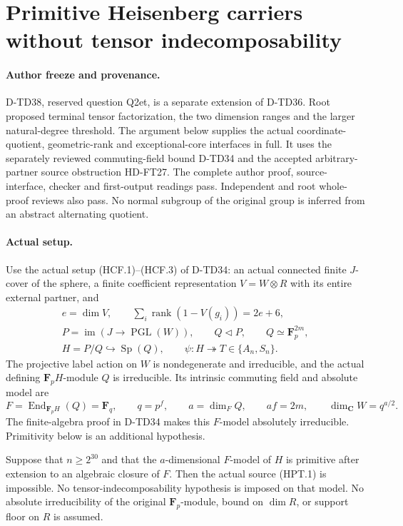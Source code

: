 \section{Primitive Heisenberg carriers without tensor indecomposability}
\label{sec:heisenberg-primitive-tensor-carrier}

\paragraph{Author freeze and provenance.}
D-TD38, reserved question Q2et, is a separate extension of D-TD36.
Root proposed terminal tensor factorization, the two dimension ranges
and the larger natural-degree threshold.  The argument below supplies
the actual coordinate-quotient, geometric-rank and exceptional-core
interfaces in full.  It uses the separately reviewed commuting-field
bound D-TD34 and the accepted arbitrary-partner source obstruction
HD-FT27.  The complete author proof, source-interface, checker and
first-output readings pass.  Independent and root whole-proof reviews also pass.
No normal subgroup of the original group is inferred from an
abstract alternating quotient.

\paragraph{Actual setup.}
Use the actual setup (HCF.1)--(HCF.3) of D-TD34: an actual connected
finite $J$-cover of the sphere, a finite coefficient representation
$V=W\otimes R$ with its entire external partner, and
\[
 \begin{gathered}
 e=\dim V,\qquad \sum_i\operatorname{rank}(1-V(g_i))=2e+6,\\
 P=\operatorname{im}(J\to\operatorname{PGL}(W)),\qquad
 Q\triangleleft P,\qquad Q\simeq\mathbf F_p^{2m},\\
 H=P/Q\hookrightarrow\operatorname{Sp}(Q),\qquad
 \psi:H\twoheadrightarrow T\in\{A_n,S_n\}.
 \end{gathered}
 \tag{HPT.1}
\]
The projective label action on $W$ is nondegenerate and irreducible,
and the actual defining $\mathbf F_pH$-module $Q$ is irreducible.
Its intrinsic commuting field and absolute model are
\[
 F=\operatorname{End}_{\mathbf F_pH}(Q)=\mathbf F_q,\qquad
 q=p^f,\qquad a=\dim_F Q,\qquad af=2m,\qquad
 \dim_{\mathbf C}W=q^{a/2}.
 \tag{HPT.2}
\]
The finite-algebra proof in D-TD34 makes this $F$-model absolutely
irreducible.  Primitivity below is an additional hypothesis.

\begin{theorem}[D-TD38]
Suppose that $n\ge2^{30}$ and that the $a$-dimensional $F$-model
of $H$ is primitive after extension to an algebraic closure of $F$.
Then the actual source (HPT.1) is impossible.
No tensor-indecomposability hypothesis is imposed on that model.
No absolute irreducibility of the original $\mathbf F_p$-module,
bound on $\dim R$, or support floor on $R$ is assumed.
\end{theorem}

